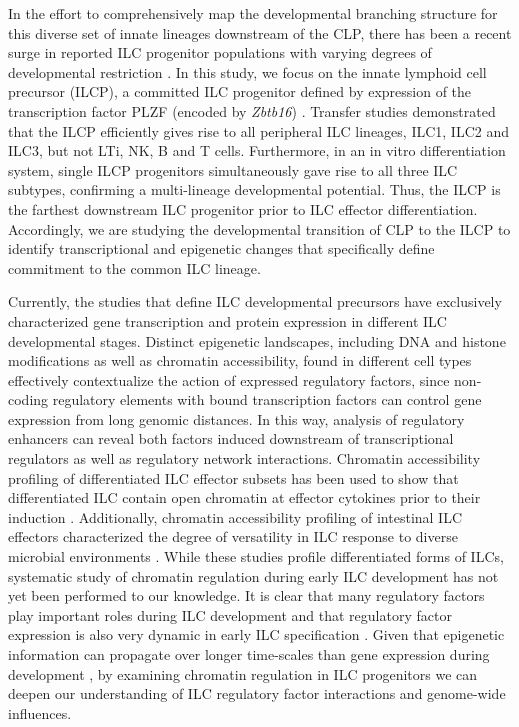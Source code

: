 In the effort to comprehensively map the developmental branching structure for this diverse set of innate lineages downstream of the CLP, there has been a recent surge in reported ILC progenitor populations with varying degrees of developmental restriction \cite{ishizuka2016review}. In this study, we focus on the innate lymphoid cell precursor (ILCP), a committed ILC progenitor defined by expression of the transcription factor PLZF (encoded by \textit{Zbtb16}) \cite{constantinides2014}. Transfer studies demonstrated that the ILCP efficiently gives rise to all peripheral ILC lineages, ILC1, ILC2 and ILC3, but not LTi, NK, B and T cells. Furthermore, in an in vitro differentiation system, single ILCP progenitors simultaneously gave rise to all three ILC subtypes, confirming a multi-lineage developmental potential. Thus, the ILCP is the farthest downstream ILC progenitor prior to ILC effector differentiation. Accordingly, we are studying the developmental transition of CLP to the ILCP to identify transcriptional and epigenetic changes that specifically define commitment to the common ILC lineage. 

Currently, the studies that define ILC developmental precursors have exclusively characterized gene transcription and protein expression in different ILC developmental stages. Distinct epigenetic landscapes, including DNA and histone modifications as well as chromatin accessibility, found in different cell types effectively contextualize the action of expressed regulatory factors, since non-coding regulatory elements with bound transcription factors can control gene expression from long genomic distances. In this way, analysis of regulatory enhancers can reveal both factors induced downstream of transcriptional regulators as well as regulatory network interactions. Chromatin accessibility profiling of differentiated ILC effector subsets has been used to show that differentiated ILC contain open chromatin at effector cytokines prior to their induction \cite{shih2016}. Additionally, chromatin accessibility profiling of intestinal ILC effectors characterized the degree of versatility in ILC response to diverse microbial environments \cite{gury2016}. While these studies profile differentiated forms of ILCs, systematic study of chromatin regulation during early ILC development has not yet been performed to our knowledge. It is clear that many regulatory factors play important roles during ILC development and that regulatory factor expression is also very dynamic in early ILC specification \cite{ishizuka2016review}. Given that epigenetic information can propagate over longer time-scales than gene expression during development \cite{bornstein2014,lara2014}, by examining chromatin regulation in ILC progenitors we can deepen our understanding of ILC regulatory factor interactions and genome-wide influences. 

